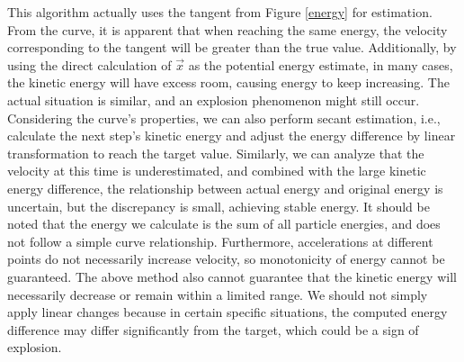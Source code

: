 \documentclass{article}
\begin{document}
This algorithm actually uses the tangent from Figure \ref{energy} for estimation. From the curve, it is apparent that when reaching the same energy, the velocity corresponding to the tangent will be greater than the true value. Additionally, by using the direct calculation of $\vec{x}$ as the potential energy estimate, in many cases, the kinetic energy will have excess room, causing energy to keep increasing. The actual situation is similar, and an explosion phenomenon might still occur. Considering the curve's properties, we can also perform secant estimation, i.e., calculate the next step's kinetic energy and adjust the energy difference by linear transformation to reach the target value. Similarly, we can analyze that the velocity at this time is underestimated, and combined with the large kinetic energy difference, the relationship between actual energy and original energy is uncertain, but the discrepancy is small, achieving stable energy. It should be noted that the energy we calculate is the sum of all particle energies, and does not follow a simple curve relationship. Furthermore, accelerations at different points do not necessarily increase velocity, so monotonicity of energy cannot be guaranteed. The above method also cannot guarantee that the kinetic energy will necessarily decrease or remain within a limited range. We should not simply apply linear changes because in certain specific situations, the computed energy difference may differ significantly from the target, which could be a sign of explosion.
\end{document}
